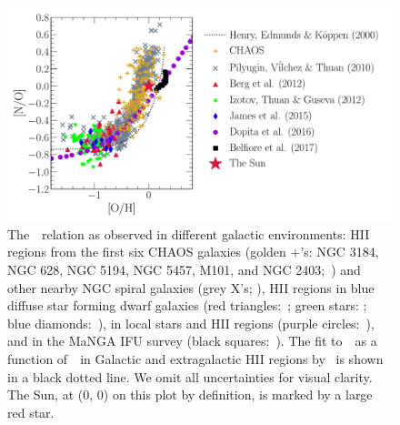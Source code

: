 \documentclass[ms.tex]{subfiles}
\begin{document}
\begin{figure}
\centering
\includegraphics[scale = 0.63]{no_oh_observed.pdf}
\caption{
	The~\ohno~relation as observed in different galactic environments:
	HII regions from the first six CHAOS galaxies (golden +'s: NGC 3184, NGC
	628, NGC 5194, NGC 5457, M101, and NGC 2403;~\citealp{Berg2020,
	Skillman2020, Rogers2021}) and other nearby NGC spiral galaxies (grey X's;
	\citealp{Pilyugin2010}), HII regions in blue diffuse star forming dwarf
	galaxies (red triangles:~\citealp{Berg2012}; green stars:
	\citealp{Izotov2012}; blue diamonds:~\citealp{James2015}), in local stars
	and HII regions (purple circles:~\citealp{Dopita2016}), and in the MaNGA
	IFU survey (black squares:~\citealp{Belfiore2017}).
	The fit to~\no~as a function of~\oh~in Galactic and extragalactic HII
	regions by~\citet{Henry2000} is shown in a black dotted line.
	We omit all uncertainties for visual clarity.
	The Sun, at (0, 0) on this plot by definition, is marked by a large red
	star. 
}
\label{fig:no_oh_observed}
\end{figure}
\end{document}
